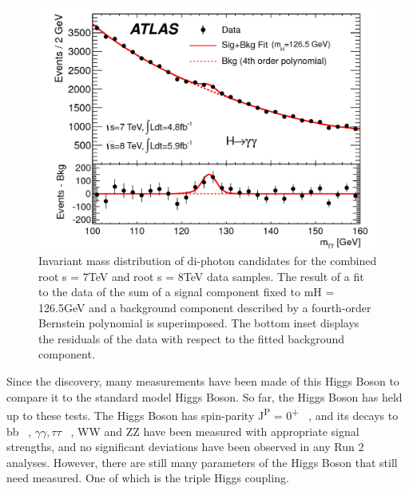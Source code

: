 \begin{figure}[h]
\begin{center}
\includegraphics[scale=0.25]{figures/higgs_disc}
\caption[Higgs boson mass peak]{Invariant mass distribution of di-photon candidates for the combined root s = 7TeV and root s = 8TeV data samples. The result of a fit to the data of the sum of a signal component fixed to mH = 126.5GeV and a background component described by a fourth-order Bernstein polynomial is superimposed. The bottom inset displays the residuals of the data with respect to the fitted background component.}
\label{fig:Higgs}
\end{center}
\end{figure}

Since the discovery, many measurements have been made of this Higgs Boson to compare it to the standard model Higgs Boson. So far, the Higgs Boson has held up to these tests. The Higgs Boson has spin-parity J\textsuperscript{P} = 0\textsuperscript{+} ~\cite{Aad:2013xqa}, and its decays to bb ~\cite{Aaboud:2018zhk}, ${\gamma\gamma, \tau\tau}$ ~\cite{Aaboud:2018pen}, WW and ZZ have been measured with appropriate signal strengths, and no significant deviations have been observed in any Run 2 analyses. However, there are still many parameters of the Higgs Boson that still need measured. One of which is the triple Higgs coupling.
